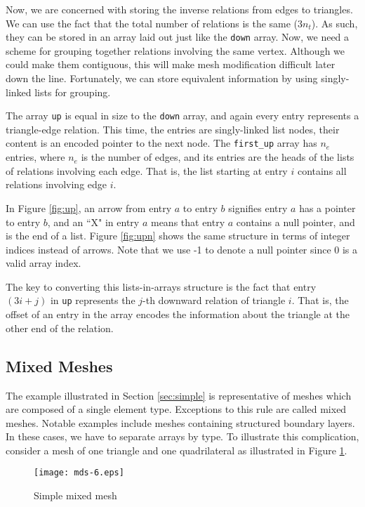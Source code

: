 \documentclass{article}
\begin{document}
Now, we are concerned with storing the inverse relations from edges
to triangles.
We can use the fact that the total number of relations is the same ($3n_t$).
As such, they can be stored in an array laid out just like the \texttt{down}
array.
Now, we need a scheme for grouping together relations involving the same
vertex.
Although we could make them contiguous, this will make mesh modification
difficult later down the line.
Fortunately, we can store equivalent information by using singly-linked
lists for grouping.

The array \texttt{up} is equal in size to the \texttt{down}
array, and again every entry represents a triangle-edge relation.
This time, the entries are singly-linked list nodes, their content
is an encoded pointer to the next node.
The \texttt{first\_up} array has $n_e$ entries, where $n_e$ is the
number of edges, and its entries are the heads of the lists of relations
involving each edge.
That is, the list starting at entry $i$ contains all relations involving edge
$i$.

In Figure \ref{fig:up}, an arrow from entry $a$ to entry $b$ signifies
entry $a$ has a pointer to entry $b$, and an ``X" in entry $a$
means that entry $a$ contains a null pointer, and is the end of a list.
Figure \ref{fig:upn} shows the same structure in terms of integer indices
instead of arrows.
Note that we use -1 to denote a null pointer since 0 is a valid array index.

The key to converting this lists-in-arrays structure is the fact that
entry $(3i+j)$ in \texttt{up} represents the $j$-th downward
relation of triangle $i$.
That is, the offset of an entry in the array encodes the information
about the triangle at the other end of the relation.

\subsection{Mixed Meshes}
\label{sec:mixed}

The example illustrated in Section \ref{sec:simple} is representative of meshes
which are composed of a single element type.
Exceptions to this rule are called mixed meshes.
Notable examples include meshes containing structured boundary layers.
In these cases, we have to separate arrays by type.
To illustrate this complication, consider a mesh of one triangle and one
quadrilateral as illustrated in Figure \ref{fig:mixed}.

\begin{figure}[ht!]
\centering
\texttt{[image: mds-6.eps]}
\caption{Simple mixed mesh}
\label{fig:mixed}
\end{figure}
\end{document}
